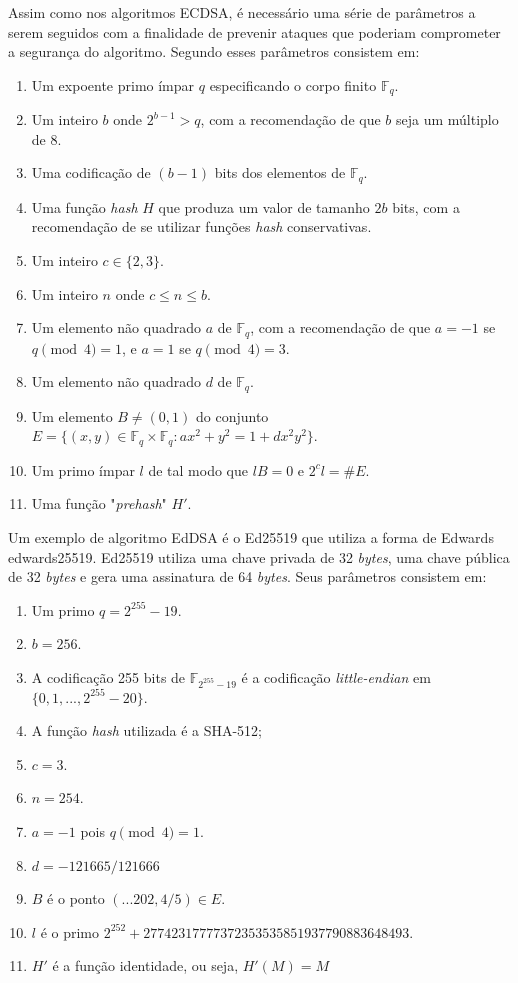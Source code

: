 Assim como nos algoritmos ECDSA, é necessário uma série de parâmetros a serem seguidos com a finalidade de prevenir ataques que poderiam comprometer a segurança do algoritmo. Segundo  esses parâmetros consistem em: 
\begin{enumerate}
    \item Um expoente primo ímpar $q$ especificando o corpo finito $\mathbb{F}_q$.
    \item Um inteiro $b$ onde $2^{b-1} > q$, com a recomendação de que $b$ seja um múltiplo de 8.
    \item Uma codificação de $(b-1)$ bits dos elementos de $\mathbb{F}_q$.
    \item Uma função \textit{hash} $H$ que produza um valor de tamanho $2b$ bits, com a recomendação de se utilizar funções \textit{hash} conservativas.
    \item Um inteiro $c \in \{2,3\}$.
    \item Um inteiro $n$ onde $c \le n \le b$.
    \item Um elemento não quadrado $a$ de $\mathbb{F}_q$, com a recomendação de que $a = -1$ se $q \pmod{4} = 1$, e $a = 1$ se $q \pmod{4} = 3$.
    \item Um elemento não quadrado $d$ de $\mathbb{F}_q$.
    \item Um elemento $B \ne (0, 1)$ do conjunto $E = \big\{ (x, y) \in \mathbb{F}_q \times \mathbb{F}_q : ax^2 + y^2 = 1 + dx^2y^2 \big\}$.
    \item Um primo ímpar $l$ de tal modo que $lB = 0$ e $2^cl = \#E$.
    \item Uma função "\textit{prehash}" $H'$.
\end{enumerate}

Um exemplo de algoritmo EdDSA é o Ed25519 que utiliza a forma de Edwards edwards25519. Ed25519 utiliza uma chave privada de 32 \textit{bytes}, uma chave pública de 32 \textit{bytes} e gera uma assinatura de 64 \textit{bytes}. Seus parâmetros consistem em:

\begin{enumerate}
    \item Um primo $ q = 2^{255} - 19$.
    \item $b = 256$.
    \item A codificação 255 bits de $\mathbb{F}_{2^{255}-19}$ é a codificação \textit{little-endian} em $\{ 0,1,..., 2^{255}-20 \}$.
    \item A função \textit{hash} utilizada é a SHA-512;
    \item $c = 3$.
    \item $n = 254$.
    \item $a = -1$ pois $q \pmod{4} = 1$.
    \item $d = -121665/121666$
    \item $B$ é o ponto $(...202, 4/5) \in E$.
    \item $l$ é o primo $2^{252} + 27742317777372353535851937790883648493$.
    \item $H'$ é a função identidade, ou seja, $H'(M) = M$
\end{enumerate}


